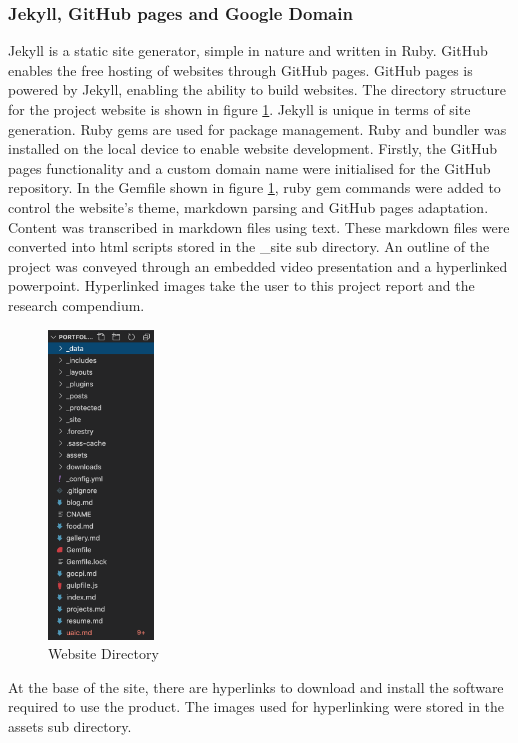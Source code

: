 \documentclass[12pt]{article}
\begin{document}
\subsubsection{Jekyll, GitHub pages and Google Domain}
Jekyll is a static site generator, simple in nature and written in Ruby.
GitHub enables the free hosting of websites through GitHub pages.
GitHub pages is powered by Jekyll, enabling the ability to build websites.
The directory structure for the project website is shown in figure \ref{fig:WD}.
Jekyll is unique in terms of site generation. Ruby gems are used for package management. 
Ruby and bundler was installed on the local device to enable website development.
Firstly, the GitHub pages functionality and a custom domain name were initialised for the GitHub repository.
In the Gemfile shown in figure \ref{fig:WD}, ruby gem commands were added to control the website's theme, markdown parsing and GitHub pages adaptation.
Content was transcribed in markdown files using text.
These markdown files were converted into html scripts stored in the \_site sub directory. 
An outline of the project was conveyed through an embedded video presentation and a hyperlinked powerpoint.
Hyperlinked images take the user to this project report and the research compendium.
\begin{figure}
	\centering
	\includegraphics[width = 0.25\textwidth]{website-dir.png}
	\caption{Website Directory}
	\label{fig:WD}
\end{figure}
At the base of the site, there are hyperlinks to download and install the software required to use the product.
The images used for hyperlinking were stored in the assets sub directory.
\end{document}

